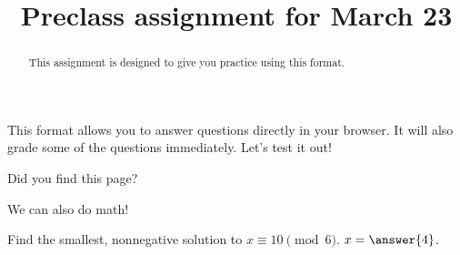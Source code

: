 \documentclass{ximera}
\title{Preclass assignment for March 23}
\begin{document}
  
\begin{abstract}  
This assignment is designed to give you practice using this format.
\end{abstract}  
\maketitle  

This format allows you to answer questions directly in your browser. It will also grade some of the questions immediately. Let's test it out!

\begin{question}
 Did you find this page?
 
\begin{multipleChoice}
\end{multipleChoice}
\end{question}

We can also do math!
\begin{question}
 Find the smallest, nonnegative solution to $x\equiv 10 \pmod 6$. $x=\answer{4}$.
\end{question}

%
%
\end{document}

